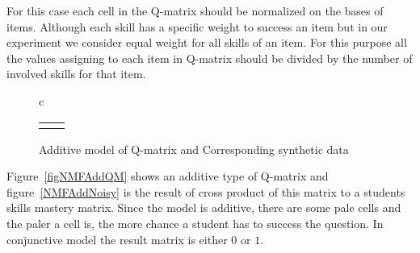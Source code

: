 For this case each cell in the Q-matrix should be normalized on the bases of items. Although each skill has a specific weight to success an item but in our experiment we consider equal weight for all skills of an item. For this purpose all the values assigning to each item in Q-matrix should be divided by the number of involved skills for that item.

\begin{figure}[h]
\begin{tabular}{c}
\\
\begin{tabular}{cc}
\subfigure[Raw Result matrix ]{
   \includegraphics[scale =0.5] {NMFAddNonNoisy.pdf}\label{NMFAddNonNoisy}
 }\quad
&
\subfigure[Discretized result matrix with 20\% slip and 10\% guess factor]{
   \includegraphics[scale =0.5] {NMFAddNoisy}\label{NMFAddNoisy}
 }\quad
\end{tabular}
\end{tabular}
\caption{Additive model of Q-matrix and Corresponding synthetic data}
\label{figNMFAddgen}
\end{figure}

Figure~\ref{figNMFAddQM} shows an additive type of Q-matrix and figure~\ref{NMFAddNoisy} is the result of cross product of this matrix to a students skills mastery matrix. Since the model is additive, there are some pale cells and the paler a cell is, the more chance a student has to success the question. In conjunctive model the result matrix is either $0$ or $1$. 

